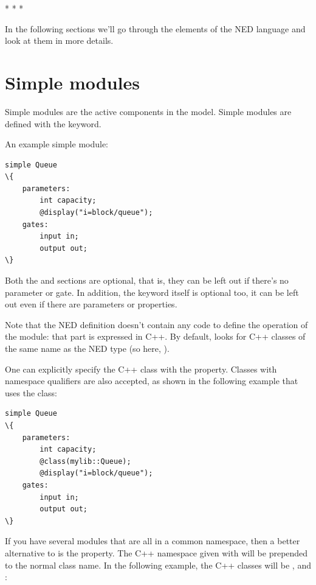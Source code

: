 
\bigskip
\begin{center}* * *\end{center}
\bigskip

In the following sections we'll go through the elements of the NED
language and look at them in more details.



\section{Simple modules}
\label{sec:ch-ned-lang:simple-modules}

Simple modules are the active components in the model.
Simple modules are defined with the  keyword.

An example simple module:

\begin{Verbatim}[commandchars=\\\{\}]
simple Queue
\{
    parameters:
        int capacity;
        @display("i=block/queue");
    gates:
        input in;
        output out;
\}
\end{Verbatim}

Both the  and  sections are optional, that is,
they can be left out if there's no parameter or gate. In addition, the
 keyword itself is optional too, it can be left out
even if there are parameters or properties.

Note that the NED definition doesn't contain any code to define the
operation of the module: that part is expressed in C++. By default, {\opp}
looks for C++ classes of the same name as the NED type (so here, ).

One can explicitly specify the C++ class with the  property.
Classes with namespace qualifiers are also accepted, as shown in the following
example that uses the  class:

\begin{Verbatim}[commandchars=\\\{\}]
simple Queue
\{
    parameters:
        int capacity;
        @class(mylib::Queue);
        @display("i=block/queue");
    gates:
        input in;
        output out;
\}
\end{Verbatim}

If you have several modules that are all in a common namespace, then a
better alternative to  is the  property. The
C++ namespace given with  will be prepended to the normal
class name. In the following example, the C++ classes will be
,  and :

